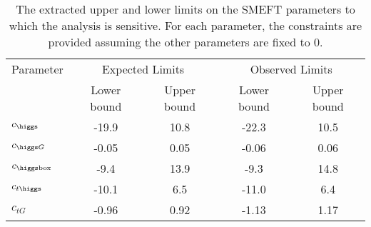 \begin{table}[!tbh]
	\centering
	\caption{
	The extracted upper and lower limits on the SMEFT parameters to which the analysis is sensitive.
	For each parameter, the constraints are provided assuming the other parameters are fixed to $0$.
	}
	\begin{tabular}{|l |c c| c c|}
		\hline
Parameter & \multicolumn{2}{|c|}{Expected Limits} & \multicolumn{2}{c|}{Observed Limits} \\
& Lower bound & Upper bound & Lower bound & Upper bound  \\
            		\hline\hline
$c_{\higgs}$            & -19.9 & 10.8 &  -22.3 & 10.5 \\
$c_{\higgs G}$          & -0.05 & 0.05  & -0.06 & 0.06 \\
$c_{\higgs\text{box}}$  & -9.4 & 13.9 & -9.3 & 14.8 \\
$c_{t\higgs}$           & -10.1 & 6.5  & -11.0 & 6.4 \\
$c_{tG}$                & -0.96 & 0.92  & -1.13 & 1.17 \\

		\hline
	\end{tabular}
\label{tab:res_smeft}
\end{table}

